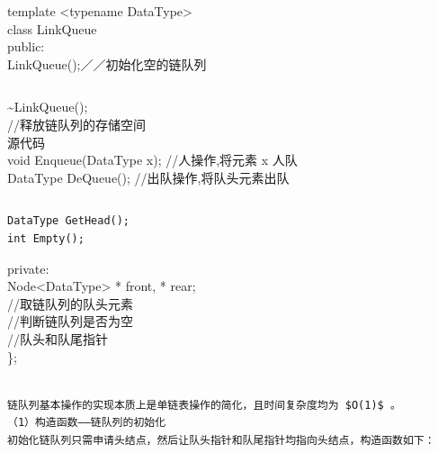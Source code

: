 \documentclass[10pt]{article}
\begin{document}
template <typename DataType>\\
class LinkQueue\\
public:\\
LinkQueue();／／初始化空的链队列

\begin{verbatim}

\end{verbatim}

\~{}LinkQueue();\\
//释放链队列的存储空间\\
源代码\\
void Enqueue(DataType x); //人操作,将元素 x 人队\\
DataType DeQueue(); //出队操作,将队头元素出队

\begin{verbatim}

\end{verbatim}

\begin{verbatim}
DataType GetHead();
int Empty();
\end{verbatim}

private:\\
Node<DataType> * front, * rear;\\
//取链队列的队头元素\\
//判断链队列是否为空\\
//队头和队尾指针\\
\};

\begin{verbatim}

链队列基本操作的实现本质上是单链表操作的简化，且时间复杂度均为 $O(1)$ 。
（1）构造函数——链队列的初始化
初始化链队列只需申请头结点，然后让队头指针和队尾指针均指向头结点，构造函数如下：
\end{verbatim}
\end{document}

